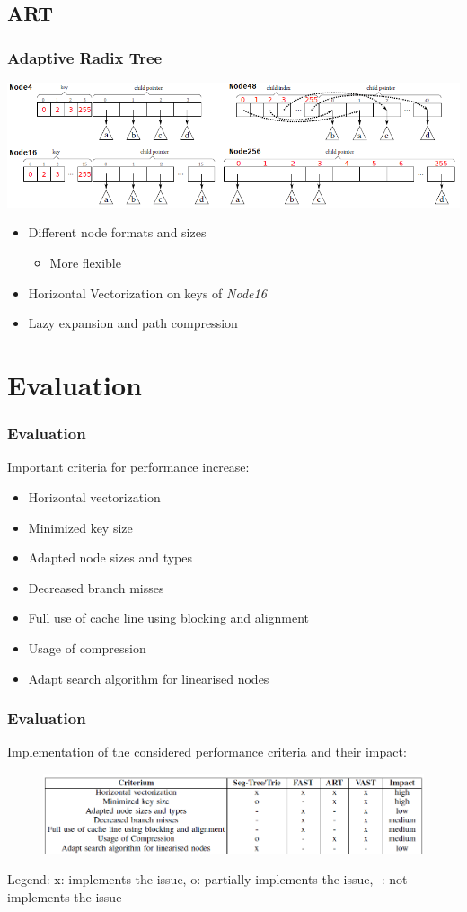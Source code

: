 \documentclass{beamer}
\begin{document}
\subsection{ART}
\begin{frame}
\frametitle{Adaptive Radix Tree}
\begin{center}
	\includegraphics[width=1.05\textwidth]{img/art2.png}
\end{center}
\begin{itemize}
	\item Different node formats and sizes
	\begin{itemize}
		\item More flexible
	\end{itemize}
	\item Horizontal Vectorization on keys of \emph{Node16}
	\item Lazy expansion and path compression
\end{itemize}
\end{frame}
\section{Evaluation}

\begin{frame}
\frametitle{Evaluation}
Important criteria for performance increase:
\begin{itemize}
	\item Horizontal vectorization
	\item Minimized key size
	\item Adapted node sizes and types
	\item Decreased branch misses
	\item Full use of cache line using blocking and alignment
	\item Usage of compression
	\item Adapt search algorithm for linearised nodes
\end{itemize}
\end{frame}

\begin{frame}
\frametitle{Evaluation}
Implementation of the considered performance criteria and their impact:
\begin{figure}
	\includegraphics[width=1.05\textwidth]{img/table_eval.png}
\end{figure}
Legend: x: implements the issue, o: partially implements the issue, -: not implements the issue
\end{frame}
\end{document}
